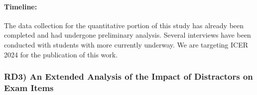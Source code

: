 \documentclass[authorversion,nonacm]{acmart}
\begin{document}
\paragraph{Timeline:} The data collection for the quantitative portion of this
study has already been completed and had undergone preliminary analysis. Several 
interviews have been conducted with students with more currently underway. We are 
targeting ICER 2024 for the publication of this work.
 
\subsubsection{RD3) An Extended Analysis of the Impact of Distractors on Exam Items }\label{sec:itemquality}

\end{document}

